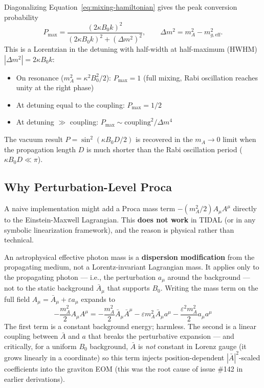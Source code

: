 Diagonalizing Equation~\ref{eq:mixing-hamiltonian} gives the peak conversion
probability
\begin{equation}
  P_{\max} = \frac{(2\kappa B_0 k)^2}{(2\kappa B_0 k)^2 + (\Delta m^2)^2},
  \qquad \Delta m^2 = m_A^2 - m_{g,\mathrm{eff}}^2.
  \label{eq:lorentzian}
\end{equation}
This is a Lorentzian in the detuning with half-width at half-maximum
(HWHM) $|\Delta m^2| = 2\kappa B_0 k$:
\begin{itemize}
  \item On resonance ($m_A^2 = \kappa^2 B_0^2 / 2$): $P_{\max} = 1$ (full
    mixing, Rabi oscillation reaches unity at the right phase)
  \item At detuning equal to the coupling: $P_{\max} = 1/2$
  \item At detuning $\gg$ coupling: $P_{\max} \sim \mathrm{coupling}^2 / \Delta m^4$
\end{itemize}
The vacuum result $P = \sin^2(\kappa B_0 D / 2)$ is recovered in the
$m_A \to 0$ limit when the propagation length $D$ is much shorter than
the Rabi oscillation period ($\kappa B_0 D \ll \pi$).

\subsection{Why Perturbation-Level Proca}
\label{subsec:why-perturbation-proca}

A naive implementation might add a Proca mass term $-(m_A^2/2) A_\mu A^\mu$
directly to the Einstein-Maxwell Lagrangian. This \textbf{does not work}
in TIDAL (or in any symbolic linearization framework), and the reason is
physical rather than technical.

An astrophysical effective photon mass is a \textbf{dispersion modification}
from the propagating medium, not a Lorentz-invariant Lagrangian mass. It
applies only to the propagating photon --- i.e., the perturbation $a_\mu$
around the background --- not to the static background $\bar{A}_\mu$ that
supports $B_0$. Writing the mass term on the full field $A_\mu = \bar{A}_\mu
+ \varepsilon a_\mu$ expands to
\begin{equation}
  -\frac{m_A^2}{2} A_\mu A^\mu
  = -\frac{m_A^2}{2} \bar A_\mu \bar A^\mu
  - \varepsilon m_A^2 \bar A_\mu a^\mu
  - \frac{\varepsilon^2 m_A^2}{2} a_\mu a^\mu
\end{equation}
The first term is a constant background energy; harmless. The second is
a linear coupling between $\bar A$ and $a$ that breaks the perturbative
expansion --- and critically, for a uniform $B_0$ background, $\bar A$ is
\emph{not} constant in Lorenz gauge (it grows linearly in a coordinate)
so this term injects position-dependent $|\bar A|^2$-scaled coefficients
into the graviton EOM (this was the root cause of issue \#142 in earlier
derivations).

